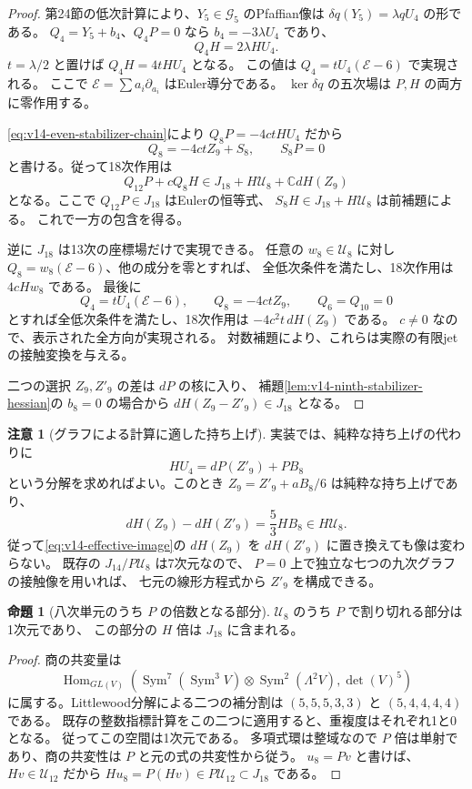\documentclass[a4paper,11pt]{ltjsarticle}
\theoremstyle{definition}
\newtheorem{remark}[theorem]{注意}
\newtheorem{proposition}[theorem]{命題}
\newcommand{\CC}{\mathbb C}
\begin{document}
\begin{proof}
第24節の低次計算により、$Y_5\in\mathcal G_5$ のPfaffian像は
$\delta q(Y_5)=\lambda qU_4$ の形である。
$Q_4=Y_5+b_4$、$Q_4P=0$ なら $b_4=-3\lambda U_4$ であり、
\[
 Q_4H=2\lambda HU_4.
\]
$t=\lambda/2$ と置けば $Q_4H=4tHU_4$ となる。
この値は $Q_4=tU_4(\mathcal E-6)$ で実現される。
ここで $\mathcal E=\sum a_i\partial_{a_i}$ はEuler導分である。
$\ker\delta q$ の五次場は $P,H$ の両方に零作用する。

\eqref{eq:v14-even-stabilizer-chain}により
$Q_8P=-4ctHU_4$ だから
\[
 Q_8=-4ctZ_9+S_8,\qquad S_8P=0
\]
と書ける。従って18次作用は
\[
 Q_{12}P+cQ_8H
 \in J_{18}+H\mathcal U_8+\CC dH(Z_9)
\]
となる。ここで $Q_{12}P\in J_{18}$ はEulerの恒等式、
$S_8H\in J_{18}+H\mathcal U_8$ は前補題による。
これで一方の包含を得る。

逆に $J_{18}$ は13次の座標場だけで実現できる。
任意の $w_8\in\mathcal U_8$ に対し
$Q_8=w_8(\mathcal E-6)$、他の成分を零とすれば、
全低次条件を満たし、18次作用は $4cHw_8$ である。
最後に
\[
 Q_4=tU_4(\mathcal E-6),\qquad Q_8=-4ctZ_9,
 \qquad Q_6=Q_{10}=0
\]
とすれば全低次条件を満たし、18次作用は $-4c^2t\,dH(Z_9)$ である。
$c\ne0$ なので、表示された全方向が実現される。
対数補題により、これらは実際の有限jetの接触変換を与える。

二つの選択 $Z_9,Z'_9$ の差は $dP$ の核に入り、
補題\ref{lem:v14-ninth-stabilizer-hessian}の $b_8=0$ の場合から
$dH(Z_9-Z'_9)\in J_{18}$ となる。
\end{proof}

\begin{remark}[グラフによる計算に適した持ち上げ]
実装では、純粋な持ち上げの代わりに
\[
 HU_4=dP(Z'_9)+PB_8
\]
という分解を求めればよい。このとき
$Z_9=Z'_9+aB_8/6$ は純粋な持ち上げであり、
\[
 dH(Z_9)-dH(Z'_9)=\frac53HB_8\in H\mathcal U_8.
\]
従って\eqref{eq:v14-effective-image}の $dH(Z_9)$ を
$dH(Z'_9)$ に置き換えても像は変わらない。
既存の $J_{14}/P\mathcal U_8$ は7次元なので、
$P=0$ 上で独立な七つの九次グラフの接触像を用いれば、
七元の線形方程式から $Z'_9$ を構成できる。
\end{remark}

\begin{proposition}[八次単元のうち $P$ の倍数となる部分]
\label{prop:v14-pdivisible-eighth-unit}
$\mathcal U_8$ のうち $P$ で割り切れる部分は1次元であり、
この部分の $H$ 倍は $J_{18}$ に含まれる。
\end{proposition}

\begin{proof}
商の共変量は
\[
 \operatorname{Hom}_{GL(V)}\left(
 \operatorname{Sym}^7(\operatorname{Sym}^3V)
 \otimes\operatorname{Sym}^2(\Lambda^2V),\det(V)^5\right)
\]
に属する。Littlewood分解による二つの補分割は
$(5,5,5,3,3)$ と $(5,4,4,4,4)$ である。
既存の整数指標計算をこの二つに適用すると、重複度はそれぞれ1と0となる。
従ってこの空間は1次元である。
多項式環は整域なので $P$ 倍は単射であり、商の共変性は
$P$ と元の式の共変性から従う。
$u_8=Pv$ と書けば、$Hv\in\mathcal U_{12}$ だから
$Hu_8=P(Hv)\in P\mathcal U_{12}\subset J_{18}$ である。
\end{proof}
\end{document}
